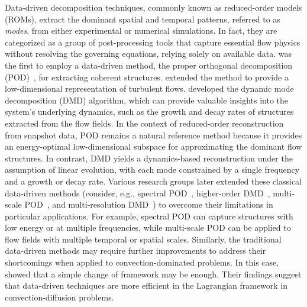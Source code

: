 \documentclass[a4paper,fleqn]{cas-sc}
\begin{document}
	Data-driven decomposition techniques, commonly known as reduced-order models (ROMs), extract the dominant spatial and temporal patterns, referred to as \textit{modes}, from either experimental or numerical simulations. In fact, they are categorized as a group of post-processing tools that capture essential flow physics without resolving the governing equations, relying solely on available data. \citet{Lumley1967166} was the first to employ a data-driven method, the proper orthogonal decomposition (POD)~\cite{volkwein2013proper,Berkooz1993}, for extracting coherent structures. \citet{Holmes1996} extended the method to provide a low-dimensional representation of turbulent flows. \citet{SCHMID2010} developed the dynamic mode decomposition (DMD) algorithm, which can provide valuable insights into the system's underlying dynamics, such as the growth and decay rates of structures extracted from the flow fields. In the context of reduced-order reconstruction from snapshot data, POD remains a natural reference method because it provides an energy-optimal low-dimensional subspace for approximating the dominant flow structures. In contrast, DMD yields a dynamics-based reconstruction under the assumption of linear evolution, with each mode constrained by a single frequency and a growth or decay rate. Various research groups later extended these classical data-driven methods (consider, e.g., spectral POD~\cite{Towne2018}, higher-order DMD~\cite{LeClainche2017}, multi-scale POD~\cite{Mendez2019}, and multi-resolution DMD~\cite{Kutzz2016a}) to overcome their limitations in particular applications. For example, spectral POD can capture structures with low energy or at multiple frequencies, while multi-scale POD can be applied to flow fields with multiple temporal or spatial scales. Similarly, the traditional data-driven methods may require further improvements to address their shortcomings when applied to convection-dominated problems. In this case, \citet{Lu2020} showed that a simple change of framework may be enough. Their findings suggest that data-driven techniques are more efficient in the Lagrangian framework in convection-diffusion problems. 
	
\end{document}
